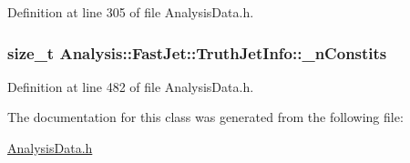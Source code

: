 Definition at line 305 of file Analysis\+Data.\+h.

\subsubsection[{\texorpdfstring{\+\_\+n\+Constits}{_nConstits}}]{\setlength{\rightskip}{0pt plus 5cm}size\+\_\+t Analysis\+::\+Fast\+Jet\+::\+Truth\+Jet\+Info\+::\+\_\+n\+Constits\hspace{0.3cm}{\ttfamily [protected]}}\hypertarget{classAnalysis_1_1FastJet_1_1TruthJetInfo_aba7d046daedfd7f63bcca2b85ff448aa}{}\label{classAnalysis_1_1FastJet_1_1TruthJetInfo_aba7d046daedfd7f63bcca2b85ff448aa}


Definition at line 482 of file Analysis\+Data.\+h.



The documentation for this class was generated from the following file\+:\begin{DoxyCompactItemize}
\item 
\hyperlink{AnalysisData_8h}{Analysis\+Data.\+h}\end{DoxyCompactItemize}
